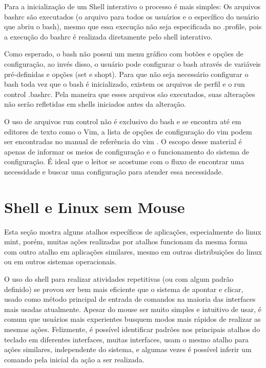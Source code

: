 \documentclass[oneside, 11 pt]{article}
\begin{document}
	Para a inicialização de um Shell interativo o processo é mais simples: Os arquivos bashrc são executados (o arquivo para todos os usuários e o específico do usuário que abriu o bash), mesmo que essa execução não seja especificada no .profile, pois a execução do bashrc é realizada diretamente pelo shell interativo.
	
	Como esperado, o bash não possui um menu gráfico com botões e opções de configuração, ao invés disso, o usuário pode configurar o bash através de variáveis pré-definidas e opções (set e shopt). Para que não seja necessário configurar o bash toda vez que o bash é inicializado, existem os arquivos de perfil e o run control .bashrc. Pela maneira que esses arquivos são executados, suas alterações não serão refletidas em shells iniciados antes da alteração.
	
	O uso de arquivos run control não é exclusivo do bash e se encontra até em editores de texto como o Vim, a lista de opções de configuração do vim podem ser encontradas no manual de referência do vim \cite{viman}. O escopo desse material é apenas de informar os meios de configuração e o funcionamento do sistema de configuração. É ideal que o leitor se acostume com o fluxo de encontrar uma necessidade e buscar uma configuração para atender essa necessidade.
	
	\newpage
	\part{Shell e Linux sem Mouse}
	
	Esta seção mostra alguns atalhos específicos de aplicações, especialmente do linux mint, porém, muitas ações realizadas por atalhos funcionam da mesma forma com outro atalho em aplicações similares, mesmo em outras distribuições do linux ou em outros sistemas operacionais.

	O uso do shell para realizar atividades repetitivas (ou com algum padrão definido) se provou ser bem mais eficiente que o sistema de apontar e clicar, usado como método principal de entrada de comandos na maioria das interfaces mais usadas atualmente. Apesar do mouse ser muito simples e intuitivo de usar, é comum que usuários mais experientes busquem modos mais rápidos de realizar as mesmas ações. Felizmente, é possível identificar padrões nos principais atalhos do teclado em diferentes interfaces, muitas interfaces, usam o mesmo atalho para ações similares, independente do sistema, e algumas vezes é possível inferir um comando pela inicial da ação a ser realizada.
	
\end{document}
